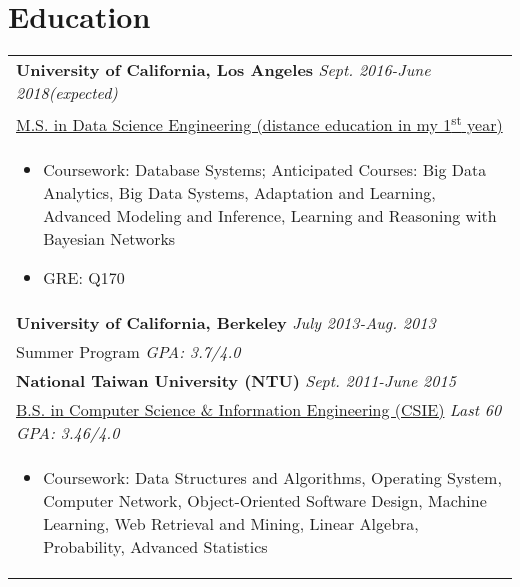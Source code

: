 \documentclass[a4paper,10pt]{article} %
\newcommand\st{\textsuperscript{st}\xspace}
\begin{document}
\section{\textbf{Education}}

\begin{tabular}{p{17cm}}
	\textsc \normalsize\textbf{University of California, Los Angeles}  \hfill  \it{Sept. 2016-June 2018(expected)}\\
\href{http://www.msol.ucla.edu/data-science-engineering/}{M.S. in Data Science Engineering (distance education in my 1\st year)} \\
\begin{itemize}
	\item Coursework: Database Systems; Anticipated Courses: Big Data Analytics, Big Data Systems, Adaptation and Learning, Advanced Modeling and Inference, Learning and Reasoning with Bayesian Networks%
	\item GRE: Q170\vspace*{-\baselineskip}
\end{itemize}\\ 
\vspace{0.5mm}

\vspace{0.5mm}
\textsc \normalsize\textbf{University of California, Berkeley}  \hfill  \it{July 2013-Aug. 2013}\\
Summer Program  \hfill \normalsize \it{GPA: 3.7/4.0} \\


\vspace{0.5mm}
\textsc \normalsize\textbf{National Taiwan University (NTU)} \hfill  \it{Sept. 2011-June 2015}\\
\href{https://www.csie.ntu.edu.tw}{B.S. in Computer Science \& Information Engineering (CSIE)} 
\hfill \it{Last 60 GPA: 3.46/4.0}\\ 
\begin{itemize}
	\item Coursework: Data Structures and Algorithms, Operating System, Computer Network, Object-Oriented Software Design, Machine Learning, Web Retrieval and Mining, Linear Algebra, Probability, Advanced Statistics \vspace*{-\baselineskip}
\end{itemize} 
\end{tabular}
\end{document}
